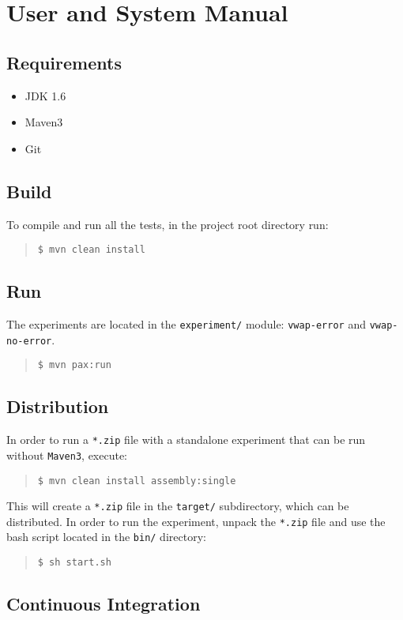 \chapter{User and System Manual}
\label{Appendix/System-Manual}

\section{Requirements}
\begin{itemize}
\item JDK 1.6
\item Maven3
\item Git
\end{itemize}

\section{Build}
To compile and run all the tests, in the project root directory run: 
\begin{quote}
\texttt{\$ mvn clean install}
\end{quote}

\section{Run}

The experiments are located in the \texttt{experiment/} module: \texttt{vwap-error} and \texttt{vwap-no-error}.

\begin{quote}
\texttt{\$ mvn pax:run}
\end{quote}

\section{Distribution}
In order to run a \texttt{*.zip} file with a standalone experiment that can be run without \texttt{Maven3}, execute:
\begin{quote}
\texttt{\$ mvn clean install assembly:single}
\end{quote}
This will create a \texttt{*.zip} file in the \texttt{target/} subdirectory, which can be distributed. In order to run the experiment, unpack the \texttt{*.zip} file and use the bash script located in the \texttt{bin/} directory:
\begin{quote}
\texttt{\$ sh start.sh}
\end{quote}

\section{Continuous Integration}

